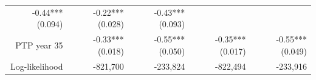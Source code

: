 \documentclass[]{article}
\begin{document}
\begin{longtable}[c]{@{}rrrrr@{}}
\begin{minipage}[t]{0.16\columnwidth}
-0.44*** (0.094)
\strut\end{minipage} &
\begin{minipage}[t]{0.21\columnwidth}\raggedleft\strut
-0.22*** (0.028)
\strut\end{minipage} &
\begin{minipage}[t]{0.15\columnwidth}\raggedleft\strut
-0.43*** (0.093)
\strut\end{minipage}\tabularnewline
\begin{minipage}[t]{0.17\columnwidth}\raggedleft\strut
PTP year 35
\strut\end{minipage} &
\begin{minipage}[t]{0.18\columnwidth}\raggedleft\strut
-0.33*** (0.018)
\strut\end{minipage} &
\begin{minipage}[t]{0.16\columnwidth}\raggedleft\strut
-0.55*** (0.050)
\strut\end{minipage} &
\begin{minipage}[t]{0.21\columnwidth}\raggedleft\strut
-0.35*** (0.017)
\strut\end{minipage} &
\begin{minipage}[t]{0.15\columnwidth}\raggedleft\strut
-0.55*** (0.049)
\strut\end{minipage}\tabularnewline
\begin{minipage}[t]{0.17\columnwidth}\raggedleft\strut
Log-likelihood
\strut\end{minipage} &
\begin{minipage}[t]{0.18\columnwidth}\raggedleft\strut
-821,700
\strut\end{minipage} &
\begin{minipage}[t]{0.16\columnwidth}\raggedleft\strut
-233,824
\strut\end{minipage} &
\begin{minipage}[t]{0.21\columnwidth}\raggedleft\strut
-822,494
\strut\end{minipage} &
\begin{minipage}[t]{0.15\columnwidth}\raggedleft\strut
-233,916
\strut\end{minipage}\tabularnewline
\bottomrule
\end{longtable}

\pagebreak
\end{document}
